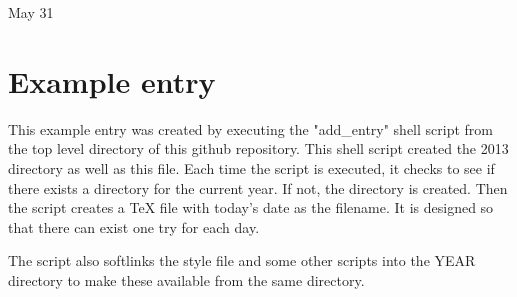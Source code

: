 \documentclass[11pt,letterpaper]{article}
\begin{document}
\logoPNG

{\Huge May 31}

\section*{Example entry }

This example entry was created by executing the "add\_entry" shell script from the top level directory of this github repository. This shell script created the 2013 directory as well as this file. Each time the script is executed, it checks to see if there exists a directory for the current year. If not, the directory is created. Then the script creates a TeX file with today's date as the filename. It is designed so that there can exist one try for each day.

The script also softlinks the style file and some other scripts into the YEAR directory to make these available from the same directory.
\end{document}
